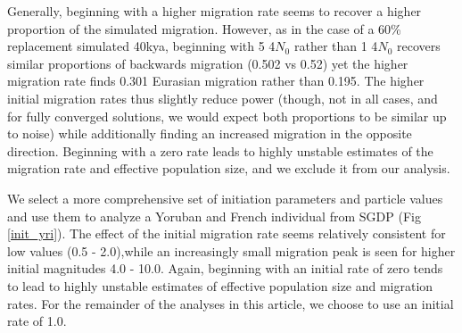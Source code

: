 \documentclass{article}
\begin{document}
Generally, beginning with a higher migration rate seems to recover a higher proportion of the simulated migration. However, as in the case of a 60\% replacement simulated 40kya, beginning with 5 4$N_0$ rather than 1 4$N_0$ recovers similar proportions of backwards migration (0.502 vs 0.52) yet the higher migration rate finds 0.301 Eurasian migration rather than 0.195. The higher initial migration rates thus slightly reduce power (though, not in all cases, and for fully converged solutions, we would expect both proportions to be similar up to noise) while additionally finding an increased migration in the opposite direction.  Beginning with a zero rate leads to highly unstable estimates of the migration rate and effective population size, and we exclude it from our analysis.

We select a more comprehensive set of initiation parameters and particle values and use them to analyze a Yoruban and French individual from SGDP (Fig \ref{init_yri}). The effect of the initial migration rate seems relatively consistent for low values (0.5 - 2.0),while an increasingly small migration peak is seen for higher initial magnitudes 4.0 - 10.0. Again, beginning with an initial rate of zero tends to lead to highly unstable estimates of effective population size and migration rates. For the remainder of the analyses in this article, we choose to use an initial rate of 1.0. 




\end{document}

